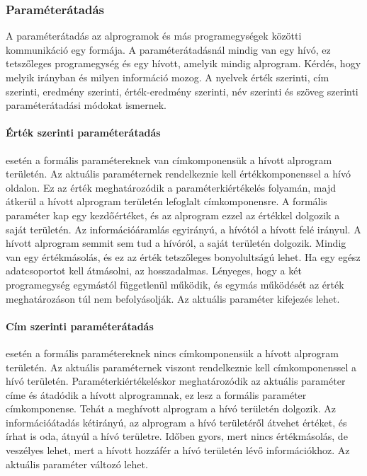 \subsubsection{Paraméterátadás}
A paraméterátadás az alprogramok és más programegységek közötti kommunikáció egy formája. A paraméterátadásnál mindig van egy hívó, ez tetszőleges programegység és egy hívott, amelyik mindig alprogram. Kérdés, hogy melyik irányban és milyen információ mozog. A nyelvek érték szerinti, cím szerinti, eredmény szerinti, érték-eredmény szerinti, név szerinti és szöveg szerinti paraméterátadási módokat ismernek.

\paragraph{Érték szerinti paraméterátadás} esetén a formális paramétereknek van címkomponensük a hívott alprogram területén. Az aktuális paraméternek rendelkeznie kell értékkomponenssel a hívó oldalon. Ez az érték meghatározódik a paraméterkiértékelés folyamán, majd átkerül a hívott alprogram területén lefoglalt címkomponensre. A formális paraméter kap egy kezdőértéket, és az alprogram ezzel az értékkel dolgozik a saját területén. Az információáramlás egyirányú, a hívótól a hívott felé irányul. A hívott alprogram semmit sem tud a hívóról, a saját területén dolgozik. Mindig van egy értékmásolás, és ez az érték tetszőleges bonyolultságú lehet. Ha egy egész adatcsoportot kell átmásolni, az hosszadalmas. Lényeges, hogy a két programegység egymástól függetlenül működik, és egymás működését az érték meghatározáson túl nem befolyásolják. Az aktuális paraméter kifejezés lehet.

\paragraph{Cím szerinti paraméterátadás} esetén a formális paramétereknek nincs címkomponensük a hívott alprogram területén. Az aktuális paraméternek viszont rendelkeznie kell címkomponenssel a hívó területén. Paraméterkiértékeléskor meghatározódik az aktuális paraméter címe és átadódik a hívott alprogramnak, ez lesz a formális paraméter címkomponense. Tehát a meghívott alprogram a hívó területén dolgozik. Az információátadás kétirányú, az alprogram a hívó területéről átvehet értéket, és írhat is oda, átnyúl a hívó területre. Időben gyors, mert nincs értékmásolás, de veszélyes lehet, mert a hívott hozzáfér a hívó területén lévő információkhoz. Az aktuális paraméter változó lehet.

